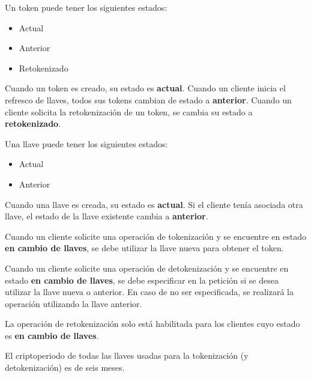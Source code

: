 {
  Un token puede tener los siguientes estados:
  \begin{itemize}
    \item Actual
    \item Anterior
    \item Retokenizado
  \end{itemize}

  Cuando un token es creado, su estado es \textbf{actual}.
  Cuando un cliente inicia el refresco de llaves, todos sus tokens cambian de
  estado a \textbf{anterior}.
  Cuando un cliente solicita la retokenización de un token, se cambia su estado
  a \textbf{retokenizado}.
}

{
  Una llave puede tener los siguientes estados:
  \begin{itemize}
    \item Actual
    \item Anterior
  \end{itemize}

  Cuando una llave es creada, su estado es \textbf{actual}. Si el cliente
  tenía asociada otra llave, el estado de la llave existente cambia a
  \textbf{anterior}.
}

{
  Cuando un cliente solicite una operación de tokenización y se encuentre en
  estado \textbf{en cambio de llaves}, se debe utilizar la llave nueva para
  obtener el token.
}

{
  Cuando un cliente solicite una operación de detokenización y se encuentre en
  estado \textbf{en cambio de llaves}, se debe especificar en la petición si
  se desea utilizar la llave nueva o anterior. En caso de no ser especificada,
  se realizará la operación utilizando la llave anterior.
}

{
  La operación de retokenización solo está habilitada para los clientes cuyo
  estado es \textbf{en cambio de llaves}.

}

{
  El criptoperiodo de todas las llaves usadas para la tokenización (y
  detokenización) es de seis meses.
}

